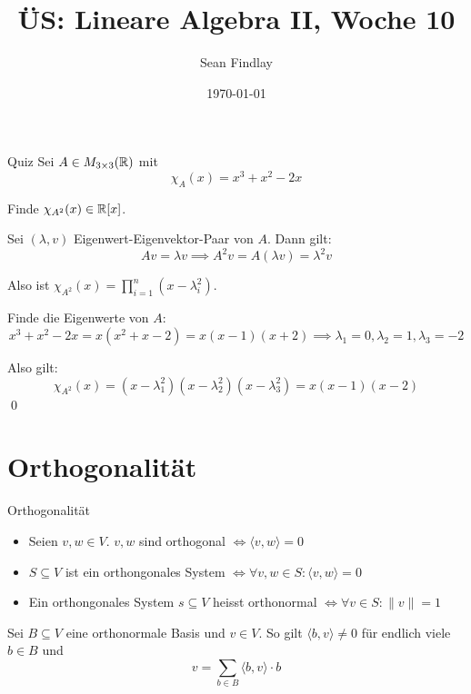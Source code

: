 \documentclass[12pt]{article}
\title{ÜS: Lineare Algebra II, Woche 10}
\author{Sean Findlay}
\date{\today}
\begin{document}
\maketitle

\begin{exercise}{Quiz}{}
    Sei $A \in M_{3 \times 3}(\mathbb{R})$ mit
    $$
        \chi_A(x) = x^3 +x^2-2x
    $$

    Finde $\chi_{A^2}(x) \in \mathbb{R}[x]$.
\end{exercise}

Sei $(\lambda, v)$ Eigenwert-Eigenvektor-Paar von $A$. Dann gilt:
$$
    Av = \lambda v \implies A^2 v = A(\lambda v) = \lambda^2 v
$$

Also ist $\chi_{A^2}(x) = \prod_{i = 1}^n (x-\lambda_i^2)$.

Finde die Eigenwerte von $A$:
$$
    x^3 +x^2-2x = x(x^2+x-2) = x(x-1)(x+2) \implies \lambda_1 = 0, \lambda_2 = 1, \lambda_3 = -2
$$

Also gilt:
$$
    \chi_{A^2}(x) = (x - \lambda_1^2)(x - \lambda_2^2)(x - \lambda_3^2) = x(x-1)(x-2)
$$ \qed

\section{Orthogonalität}

\begin{definition}{Orthogonalität}{}
    \begin{itemize}
        \item Seien $v, w \in V$. $v, w$ sind orthogonal $\iff \langle v, w \rangle = 0$
        \item $S \subseteq V$ ist ein orthongonales System $\iff \forall v, w \in S : \langle v, w \rangle = 0$
        \item Ein orthongonales System $s \subseteq V$ heisst orthonormal $\iff \forall v \in S : \lVert v \rVert = 1$
    \end{itemize}
\end{definition}

\begin{proposition}{}{}
    Sei $B \subseteq V$ eine orthonormale Basis und $v \in V$. So gilt $\langle b, v \rangle \neq 0$ für endlich viele $b \in B$ und 
    $$
        v = \sum_{b \in B} \langle b, v \rangle \cdot b
    $$
\end{proposition}
\end{document}
